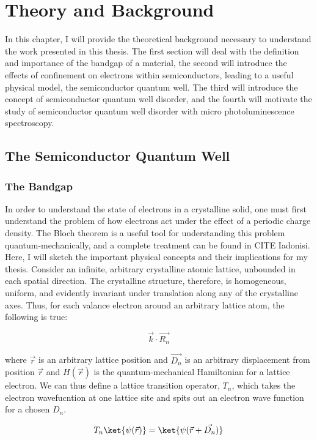 \chapter{Theory and Background}
In this chapter, I will provide the theoretical background necessary to understand the work presented in this thesis. The first section will deal with the definition and importance of the bandgap of a material, the second will introduce the effects of confinement on electrons within semiconductors, leading to a useful physical model, the semiconductor quantum well. The third will introduce the concept of semiconductor quantum well disorder, and the fourth will motivate the study of semiconductor quantum well disorder with micro photoluminescence spectroscopy.
\section{The Semiconductor Quantum Well}
\subsection{The Bandgap}
\indent In order to understand the state of electrons in a crystalline solid, one must first understand the problem of how electrons act under the effect of a periodic charge density. The Bloch theorem is a useful tool for understanding this problem quantum-mechanically, and a complete treatment can be found in CITE Iadonisi. Here, I will sketch the important physical concepts and their implications for my thesis. Consider an infinite, arbitrary crystalline atomic lattice, unbounded in each spatial direction. The crystalline structure, therefore, is homogeneous, uniform, and evidently invariant under translation along any of the crystalline axes. Thus, for each valance electron around an arbitrary lattice atom, the following is true:

\begin{equation}
\vec{k}\cdot \vec{R_n}
\end{equation}
 

where $\vec{r}$ is an arbitrary lattice position and $\vec{D_n}$ is an arbitrary displacement from position $\vec{r}$ and $H(\vec{r})$ is the quantum-mechanical Hamiltonian for a lattice electron. We can thus define a lattice transition operator, $T_n$, which takes the electron wavefucntion at one lattice site and spits out an electron wave function for a chosen $D_n$.

\begin{equation}
T_n \ket{\psi(\vec{r})}=\ket{ \psi(\vec{r} + \vec{D_n})}
\end{equation}

